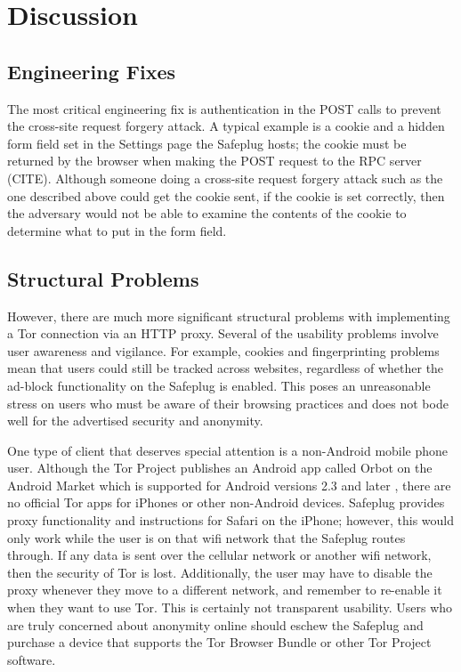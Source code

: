 \section{Discussion}
\label{sec:discussion}

\subsection{Engineering Fixes}
The most critical engineering fix is authentication in the POST calls to prevent the cross-site request forgery attack.  A typical example is a cookie and a hidden form field set in the Settings page the Safeplug hosts; the cookie must be returned by the browser when making the POST request to the RPC server (CITE).  Although someone doing a cross-site request forgery attack such as the one described above could get the cookie sent, if the cookie is set correctly, then the adversary would not be able to examine the contents of the cookie to determine what to put in the form field.

\subsection{Structural Problems}
However, there are much more significant structural problems with implementing a Tor connection via an HTTP proxy.  Several of the usability problems involve user awareness and vigilance.  For example, cookies and fingerprinting problems mean that users could still be tracked across websites, regardless of whether the ad-block functionality on the Safeplug is enabled.  This poses an unreasonable stress on users who must be aware of their browsing practices and does not bode well for the advertised security and anonymity.

One type of client that deserves special attention is a non-Android mobile phone user.  Although the Tor Project publishes an Android app called Orbot on the Android Market \cite{orbot} which is supported for Android versions 2.3 and later \cite{amorbot}, there are no official Tor apps for iPhones or other non-Android devices.  Safeplug provides proxy functionality and instructions for Safari on the iPhone; however, this would only work while the user is on that wifi network that the Safeplug routes through.  If any data is sent over the cellular network or another wifi network, then the security of Tor is lost.  Additionally, the user may have to disable the proxy whenever they move to a different network, and remember to re-enable it when they want to use Tor.  This is certainly not transparent usability.  Users who are truly concerned about anonymity online should eschew the Safeplug and purchase a device that supports the Tor Browser Bundle or other Tor Project software.

